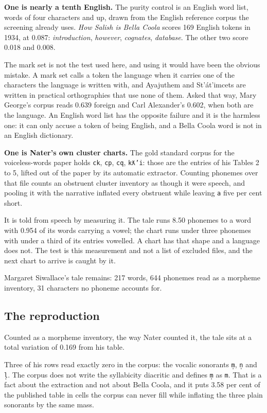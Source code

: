 \textbf{One is nearly a tenth English.} The purity control is an English word list, words of four
characters and up, drawn from the English reference corpus the screening already uses. \emph{How Salish is
Bella Coola} \cite{src:Nater-2013} scores 169 English tokens in 1934, at
0.087: \emph{introduction}, \emph{however}, \emph{cognates}, \emph{database}. The other two score
0.018 and 0.008.

The mark set is not the test used here, and using it would have been the obvious mistake. A mark set
calls a token the language when it carries one of the characters the language is written with, and
Ayajuthem and St'át'imcets are written in practical orthographies that use none of them. Asked that
way, Mary George's corpus reads 0.639 foreign and Carl Alexander's 0.602, when both are the
language. An English word list has the opposite failure and it is the harmless one: it can only
accuse a token of being English, and a Bella Coola word is not in an English dictionary.

\textbf{One is Nater's own cluster charts.} The gold standard corpus for the voiceless-words paper holds
\texttt{ck}, \texttt{cp}, \texttt{cq}, \texttt{kƛ'i}: those are the entries of his Tables 2 to 5,
lifted out of the paper by its automatic extractor. Counting phonemes over that file counts an obstruent cluster
inventory as though it were speech, and pooling it with the narrative inflated every obstruent while
leaving \texttt{a} five per cent short.

It is told from speech by measuring it. The tale runs 8.50 phonemes to a word with 0.954 of its
words carrying a vowel; the chart runs under three phonemes with under a third of its entries
vowelled. A chart has that shape and a language does not. The test is this measurement and not a
list of excluded files, and the next chart to arrive is caught by it.

Margaret Siwallace's tale remains: 217 words, 644 phonemes read as a morpheme inventory,
31 characters no phoneme accounts for.

\subsection{The reproduction}

Counted as a morpheme inventory, the way Nater counted it, the tale sits at a total variation of
0.169 from his table.

Three of his rows read exactly zero in the corpus: the vocalic sonorants \texttt{m̩}, \texttt{n̩} and
\texttt{l̩}. The corpus does not write the syllabicity diacritic and defines \texttt{m̩} as
\texttt{m}. That is a fact about the extraction and not about Bella Coola, and it puts 3.58 per cent
of the published table in cells the corpus can never fill while inflating the three plain sonorants
by the same mass.


